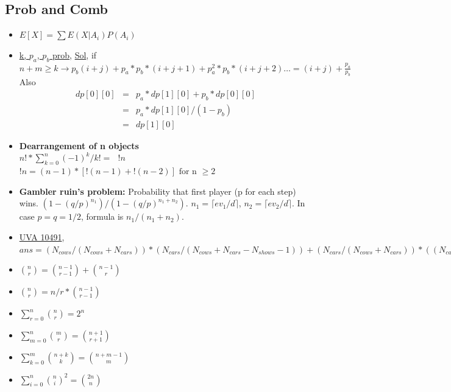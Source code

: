 \documentclass[8pt, a4paper, oneside, twocolumn]{extarticle}
\begin{document}
\subsection{Prob and Comb}
\begin{itemize}
    \item $E[X] = \sum E(X|A_i)P(A_i)$
    \item \href {https://codeforces.com/contest/908/problem/D}{k, $p_a$, $p_b$ prob}, \href {https://github.com/sourabh2311/Competitive-Programming/blob/master/CF/Good%20Bye%202017/D.cpp}{Sol}, if $n + m \geq k \rightarrow p_b(i + j) + p_a*p_b*(i + j + 1) + p_a^2*p_b*(i + j + 2)\dots = (i + j) + \frac{p_a}{p_b}$ Also
    \begin{eqnarray}
    dp[0][0] & = & p_a * dp[1][0] + p_b * dp[0][0]\\
             & = & p_a * dp[1][0] / (1 - p_b)\\
             & = & dp[1][0]
    \end{eqnarray}
    \item \textbf{Dearrangement of n objects}
    \\ $n! * \sum_{k = 0}^n (-1)^k / {k!} =\text{ } !n$
    \\ $!n = (n - 1) * [!(n - 1) + !(n - 2)] \text{ for n }\geq 2$
    \item \textbf{Gambler ruin's problem: }Probability that first player (p for each step) wins. $(1 - (q/p)^{n_1})/(1 - (q/p)^{n_1 + n_2})$. $n_1 = \lceil ev_1/d \rceil$, $n_2 = \lceil ev_2/d \rceil$. In case $p = q = 1/2$, formula is $n_1/(n_1 + n_2)$.
    \item \href{}{UVA 10491}, $ans = (N_{cows} / (N_{cows} + N_{cars})) * (N_{cars} / (N_{cows} + N_{cars} - N_{shows} - 1)) + (N_{cars} / (N_{cows} + N_{cars})) * ((N_{cars} - 1) / (N_{cows} + N_{cars} - N_{shows} - 1))$
    \item $\binom{n}{r} = \binom{n - 1}{r - 1} + \binom{n - 1}{r}$
    \item $\binom{n}{r} = n / r * \binom{n - 1}{r - 1}$
    \item $\sum_{r = 0}^n \binom{n}{r} = 2^n$
    \item $\sum_{m = 0}^n \binom{m}{r} = \binom{n + 1}{r + 1}$
    \item $\sum_{k = 0}^m \binom{n + k}{k} = \binom{n + m - 1}{m}$
    \item $\sum_{i = 0}^n \binom{n}{i}^2 = \binom{2n}{n}$
\end{itemize}
\end{document}
